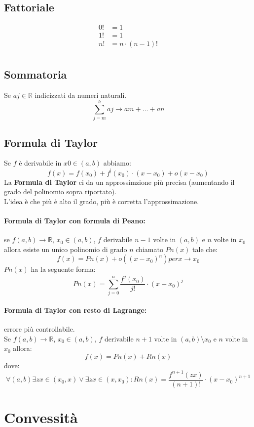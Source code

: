 \documentclass[12pt,a4paper]{article}
\let\oldsection\section
\renewcommand{\section}{\clearpage\oldsection}
\begin{document}
\subsection{Fattoriale}
\begin{align*}
  0! &= 1\\
  1! &= 1\\
  n! &= n \cdot (n-1)!\\
\end{align*}
\subsection{Sommatoria}
Se $aj \in \mathbb{R}$ indicizzati da numeri naturali.
\[
\sum_{j=m}^h aj \rightarrow am + \ldots + an
\]
\subsection{Formula di Taylor}
Se $f$ è derivabile in $x0 \in (a,b)$ abbiamo:
\[
f(x) = f(x_0) + f^|(x_0) \cdot (x-x_0) + o(x-x_0)
\]
La \textbf{Formula di Taylor} ci da un approssimzione più precisa (aumentando il grado del polinomio sopra riportato).\\
L'idea è che più è alto il grado, più è corretta l'approssimazione.
\paragraph{Formula di Taylor con formula di Peano: } se $f(a,b) \rightarrow \mathbb{R}$, $x_0 \in (a,b)$, $f$ derivabile $n-1$ volte in $(a,b)$ e $n$ volte in $x_0$ allora esiste un unico polinomio
di grado $n$ chiamato $Pn(x)$ tale che:
\[
f(x) = Pn(x) + o((x-x_0)^n) per x \to x_0
\]
$Pn(x)$ ha la seguente forma:
\[
Pn(x) = \sum_{j=0}^n \frac{f^j(x_0)}{j!} \cdot (x-x_0)^j
\]
\paragraph{Formula di Taylor con resto di Lagrange: } errore più controllabile.\\
Se $f(a,b) \rightarrow \mathbb{R}$, $x_0 \in (a,b)$, $f$ derivabile $n+1$ volte in $(a,b) \setminus {x_0}$ e $n$ volte in $x_0$ allora:
\[
f(x) = Pn(x) + Rn(x)
\]
dove:
\[
\forall (a,b) \exists zx \in (x_0,x) \lor \exists zx \in (x,x_0) : Rn(x) = \frac{f^{n+1}(zx)}{(n+1)!} \cdot (x-x_0)^{n+1}
\]
\section{Convessità}
\end{document}
